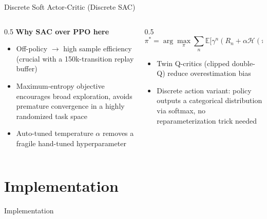 \documentclass[aspectratio=169,10pt]{beamer}
\begin{document}
\begin{frame}{Discrete Soft Actor-Critic (Discrete SAC)}
    \small
    \begin{columns}[T]
        \begin{column}{0.5\textwidth}
            \textbf{Why SAC over PPO here}
            \begin{itemize}
                \item Off-policy $\to$ high sample efficiency (crucial with a 150k-transition replay buffer)
                \item Maximum-entropy objective encourages broad exploration, avoids premature convergence in a highly randomized task space
                \item Auto-tuned temperature $\alpha$ removes a fragile hand-tuned hyperparameter
            \end{itemize}
        \end{column}
        \begin{column}{0.5\textwidth}
            \[
                \pi^{*} = \arg\max_\pi \sum_{n} \mathbb{E}\big[\gamma^n (R_n + \alpha \mathcal{H}(\pi(\cdot|S_n)))\big]
            \]
            \begin{itemize}
                \item Twin Q-critics (clipped double-Q) reduce overestimation bias
                \item Discrete action variant: policy outputs a categorical distribution via softmax, no reparameterization trick needed
            \end{itemize}
        \end{column}
    \end{columns}
\end{frame}

\section{Implementation}

\begin{frame}{Implementation}
\end{frame}
\end{document}
